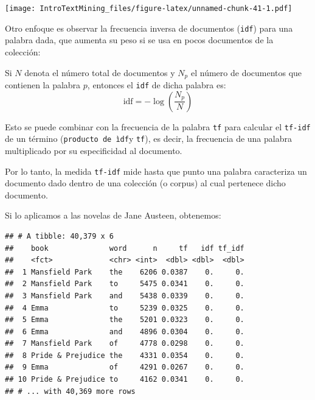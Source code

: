\documentclass[]{article}
\newenvironment{Shaded}{\begin{snugshade}}{\end{snugshade}}
\newcommand{\KeywordTok}[1]{\textcolor[rgb]{0.13,0.29,0.53}{\textbf{#1}}}
\newcommand{\DataTypeTok}[1]{\textcolor[rgb]{0.13,0.29,0.53}{#1}}
\newcommand{\StringTok}[1]{\textcolor[rgb]{0.31,0.60,0.02}{#1}}
\newcommand{\OtherTok}[1]{\textcolor[rgb]{0.56,0.35,0.01}{#1}}
\newcommand{\OperatorTok}[1]{\textcolor[rgb]{0.81,0.36,0.00}{\textbf{#1}}}
\newcommand{\NormalTok}[1]{#1}
\begin{document}
\texttt{[image: IntroTextMining\_files/figure-latex/unnamed-chunk-41-1.pdf]}

Otro enfoque es observar la frecuencia inversa de documentos
(\texttt{idf}) para una palabra dada, que aumenta su peso si se usa en
pocos documentos de la colección:

Si \(N\) denota el número total de documentos y \(N_p\) el número de
documentos que contienen la palabra \(p\), entonces el \texttt{idf} de
dicha palabra es: \[
\mbox{idf} = - \log\left(\frac{N_p}{N}\right)
\]

Esto se puede combinar con la frecuencia de la palabra \texttt{tf} para
calcular el \texttt{tf-idf} de un término (\texttt{producto\ de\ ìdf}y
\texttt{tf}), es decir, la frecuencia de una palabra multiplicado por su
especificidad al documento.

Por lo tanto, la medida \texttt{tf-idf} mide hasta que punto una palabra
caracteriza un documento dado dentro de una colección (o corpus) al cual
pertenece dicho documento.

Si lo aplicamos a las novelas de Jane Austeen, obtenemos:

\begin{Shaded}
\end{Shaded}

\begin{verbatim}
## # A tibble: 40,379 x 6
##    book              word      n     tf   idf tf_idf
##    <fct>             <chr> <int>  <dbl> <dbl>  <dbl>
##  1 Mansfield Park    the    6206 0.0387    0.     0.
##  2 Mansfield Park    to     5475 0.0341    0.     0.
##  3 Mansfield Park    and    5438 0.0339    0.     0.
##  4 Emma              to     5239 0.0325    0.     0.
##  5 Emma              the    5201 0.0323    0.     0.
##  6 Emma              and    4896 0.0304    0.     0.
##  7 Mansfield Park    of     4778 0.0298    0.     0.
##  8 Pride & Prejudice the    4331 0.0354    0.     0.
##  9 Emma              of     4291 0.0267    0.     0.
## 10 Pride & Prejudice to     4162 0.0341    0.     0.
## # ... with 40,369 more rows
\end{verbatim}
\end{document}
